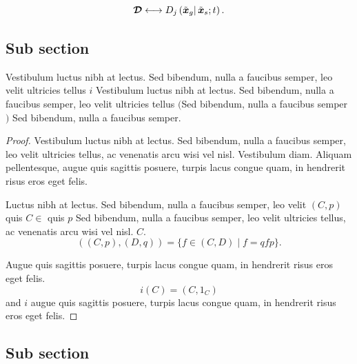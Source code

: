 \begin{definition}\label{appa:defA.4}
\lipsum[5]
\begin{equation}{\boldsymbol{\mathcal{D}}}\longleftrightarrow \text{\textit{$D_j$}}\left(\tilde{\boldsymbol x}_{\text{\textit{$g$}}}|\,\tilde{\boldsymbol x}_s;\text{\textit{$t$}}\right).\end{equation}
\end{definition}

\subsection{Sub section}
\label{appa:secA.1.2}

\begin{definition}\lipsum[5]
\end{definition}

\begin{theorem}\label{tA.2} Vestibulum luctus nibh at lectus. Sed bibendum, nulla a faucibus semper, leo velit
ultricies tellus $i$ Vestibulum luctus nibh at lectus. Sed bibendum, nulla a faucibus semper, leo velit
ultricies tellus  $($Sed bibendum, nulla a faucibus semper $)$ Sed bibendum, nulla a faucibus semper.
\end{theorem}

\begin{proof}
Vestibulum luctus nibh at lectus. Sed bibendum, nulla a faucibus semper, leo velit ultricies tellus,
ac venenatis arcu wisi vel nisl. Vestibulum diam. Aliquam pellentesque, augue quis sagittis
posuere, turpis lacus congue quam, in hendrerit risus eros eget felis.

Luctus nibh at lectus. Sed bibendum, nulla a faucibus semper, leo velit $(C,p)$ quis $C\in $ quis $p$ Sed bibendum, nulla a faucibus semper, leo velit ultricies tellus,
ac venenatis arcu wisi vel nisl. $C$. 
\begin{equation*}
((C,p),(D,q))=\{f\in (C,D)\mid f=qfp\}.
\end{equation*}

Augue quis sagittis posuere, turpis lacus congue quam, in hendrerit risus eros eget felis.
\begin{equation*}
i(C)=(C,1_C)
\end{equation*}
and $i$ augue quis sagittis posuere, turpis lacus congue quam, in hendrerit risus eros eget felis.
\end{proof}

\subsection{Sub section}
\label{appa:secA.1.3}


